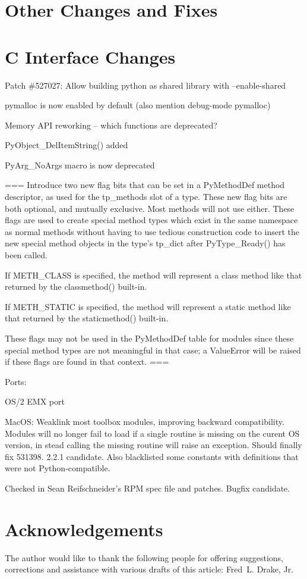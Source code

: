 \documentclass{howto}
\begin{document}
\section{Other Changes and Fixes}


\section{C Interface Changes}

Patch \#527027: Allow building python as shared library with
--enable-shared

pymalloc is now enabled by default (also mention debug-mode pymalloc)

Memory API reworking -- which functions are deprecated?  

PyObject_DelItemString() added

PyArg_NoArgs macro is now deprecated

===
Introduce two new flag bits that can be set in a PyMethodDef method
descriptor, as used for the tp_methods slot of a type.  These new flag
bits are both optional, and mutually exclusive.  Most methods will not
use either.  These flags are used to create special method types which
exist in the same namespace as normal methods without having to use
tedious construction code to insert the new special method objects in
the type's tp_dict after PyType_Ready() has been called.

If METH_CLASS is specified, the method will represent a class method
like that returned by the classmethod() built-in.

If METH_STATIC is specified, the method will represent a static method
like that returned by the staticmethod() built-in.

These flags may not be used in the PyMethodDef table for modules since
these special method types are not meaningful in that case; a
ValueError will be raised if these flags are found in that context.
===

Ports:

OS/2 EMX port

MacOS: Weaklink most toolbox modules, improving backward
compatibility. Modules will no longer fail to load if a single routine
is missing on the curent OS version, in stead calling the missing
routine will raise an exception.  Should finally fix 531398. 2.2.1
candidate.  Also blacklisted some constants with definitions that
were not Python-compatible.

Checked in Sean Reifschneider's RPM spec file and patches.  Bugfix candidate.


\section{Acknowledgements \label{acks}}

The author would like to thank the following people for offering
suggestions, corrections and assistance with various drafts of this
article: Fred~L. Drake, Jr.
\end{document}
